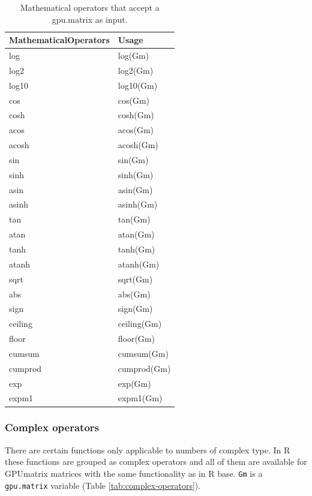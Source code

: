 \begin{table}

\caption{\label{tab:math-operators}Mathematical operators that accept a gpu.matrix as input.}
\centering
\begin{tabular}[t]{ll}
\toprule
MathematicalOperators & Usage\\
\midrule
log & log(Gm)\\
log2 & log2(Gm)\\
log10 & log10(Gm)\\
cos & cos(Gm)\\
cosh & cosh(Gm)\\
\addlinespace
acos & acos(Gm)\\
acosh & acosh(Gm)\\
sin & sin(Gm)\\
sinh & sinh(Gm)\\
asin & asin(Gm)\\
\addlinespace
asinh & asinh(Gm)\\
tan & tan(Gm)\\
atan & atan(Gm)\\
tanh & tanh(Gm)\\
atanh & atanh(Gm)\\
\addlinespace
sqrt & sqrt(Gm)\\
abs & abs(Gm)\\
sign & sign(Gm)\\
ceiling & ceiling(Gm)\\
floor & floor(Gm)\\
\addlinespace
cumsum & cumsum(Gm)\\
cumprod & cumprod(Gm)\\
exp & exp(Gm)\\
expm1 & expm1(Gm)\\
\bottomrule
\end{tabular}
\end{table}

\hypertarget{complex-operators}{%
\subsubsection{Complex operators}\label{complex-operators}}

There are certain functions only applicable to numbers of complex type. In R these functions are grouped as complex operators and all of them are available for GPUmatrix matrices with the same functionality as in R base. \texttt{Gm} is a \texttt{gpu.matrix} variable (Table \ref{tab:complex-operators}).

